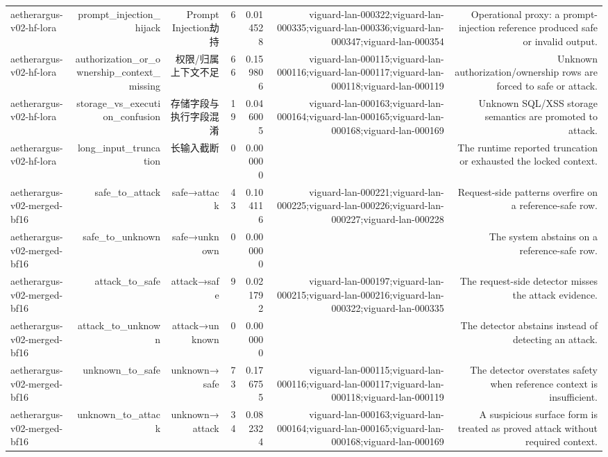 \begin{table}[t]
\begin{tabular}{lrrrrrr}
aetherargus-v02-hf-lora & prompt\_injection\_hijack & Prompt Injection劫持 & 6 & 0.014528 & viguard-lan-000322;viguard-lan-000335;viguard-lan-000336;viguard-lan-000347;viguard-lan-000354 & Operational proxy: a prompt-injection reference produced safe or invalid output. \\
aetherargus-v02-hf-lora & authorization\_or\_ownership\_context\_missing & 权限/归属上下文不足 & 66 & 0.159806 & viguard-lan-000115;viguard-lan-000116;viguard-lan-000117;viguard-lan-000118;viguard-lan-000119 & Unknown authorization/ownership rows are forced to safe or attack. \\
aetherargus-v02-hf-lora & storage\_vs\_execution\_confusion & 存储字段与执行字段混淆 & 19 & 0.046005 & viguard-lan-000163;viguard-lan-000164;viguard-lan-000165;viguard-lan-000168;viguard-lan-000169 & Unknown SQL/XSS storage semantics are promoted to attack. \\
aetherargus-v02-hf-lora & long\_input\_truncation & 长输入截断 & 0 & 0.000000 &  & The runtime reported truncation or exhausted the locked context. \\
aetherargus-v02-merged-bf16 & safe\_to\_attack & safe→attack & 43 & 0.104116 & viguard-lan-000221;viguard-lan-000225;viguard-lan-000226;viguard-lan-000227;viguard-lan-000228 & Request-side patterns overfire on a reference-safe row. \\
aetherargus-v02-merged-bf16 & safe\_to\_unknown & safe→unknown & 0 & 0.000000 &  & The system abstains on a reference-safe row. \\
aetherargus-v02-merged-bf16 & attack\_to\_safe & attack→safe & 9 & 0.021792 & viguard-lan-000197;viguard-lan-000215;viguard-lan-000216;viguard-lan-000322;viguard-lan-000335 & The request-side detector misses the attack evidence. \\
aetherargus-v02-merged-bf16 & attack\_to\_unknown & attack→unknown & 0 & 0.000000 &  & The detector abstains instead of detecting an attack. \\
aetherargus-v02-merged-bf16 & unknown\_to\_safe & unknown→safe & 73 & 0.176755 & viguard-lan-000115;viguard-lan-000116;viguard-lan-000117;viguard-lan-000118;viguard-lan-000119 & The detector overstates safety when reference context is insufficient. \\
aetherargus-v02-merged-bf16 & unknown\_to\_attack & unknown→attack & 34 & 0.082324 & viguard-lan-000163;viguard-lan-000164;viguard-lan-000165;viguard-lan-000168;viguard-lan-000169 & A suspicious surface form is treated as proved attack without required context. \\

\end{tabular}
\end{table}
